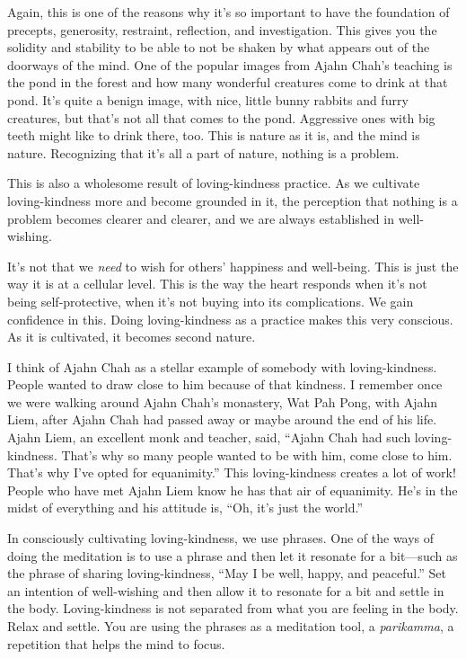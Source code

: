 Again, this is one of the reasons why it’s so important to have the
foundation of precepts, generosity, restraint, reflection, and
investigation. This gives you the solidity and stability to be able to
not be shaken by what appears out of the doorways of the mind. One of
the popular images from Ajahn Chah’s teaching is the pond in the forest
and how many wonderful creatures come to drink at that pond. It’s quite
a benign image, with nice, little bunny rabbits and furry creatures, but
that’s not all that comes to the pond. Aggressive ones with big teeth
might like to drink there, too. This is nature as it is, and the mind is
nature. Recognizing that it’s all a part of nature, nothing is a
problem.

This is also a wholesome result of loving-kindness practice. As we
cultivate loving-kindness more and become grounded in it, the perception
that nothing is a problem becomes clearer and clearer, and we are always
established in well-wishing.

It’s not that we \emph{need} to wish for others’ happiness and
well-being. This is just the way it is at a cellular level. This is the
way the heart responds when it’s not being self-protective, when it’s
not buying into its complications. We gain confidence in this. Doing
loving-kindness as a practice makes this very conscious. As it is
cultivated, it becomes second nature.

I think of Ajahn Chah as a stellar example of somebody with
loving-kindness. People wanted to draw close to him because of that
kindness. I remember once we were walking around Ajahn Chah’s monastery,
Wat Pah Pong, with Ajahn Liem, after Ajahn Chah had passed away or maybe
around the end of his life. Ajahn Liem, an excellent monk and teacher,
said, “Ajahn Chah had such loving-kindness. That’s why so many people
wanted to be with him, come close to him. That’s why I’ve opted for
equanimity.” This loving-kindness creates a lot of work! People who have
met Ajahn Liem know he has that air of equanimity. He’s in the midst of
everything and his attitude is, “Oh, it’s just the world.”

In consciously cultivating loving-kindness, we use phrases. One of the
ways of doing the meditation is to use a phrase and then let it resonate
for a bit—such as the phrase of sharing loving-kindness, “May I be well,
happy, and peaceful.” Set an intention of well-wishing and then allow it
to resonate for a bit and settle in the body. Loving-kindness is not
separated from what you are feeling in the body. Relax and settle. You
are using the phrases as a meditation tool, a \emph{parikamma}, a
repetition that helps the mind to focus.

